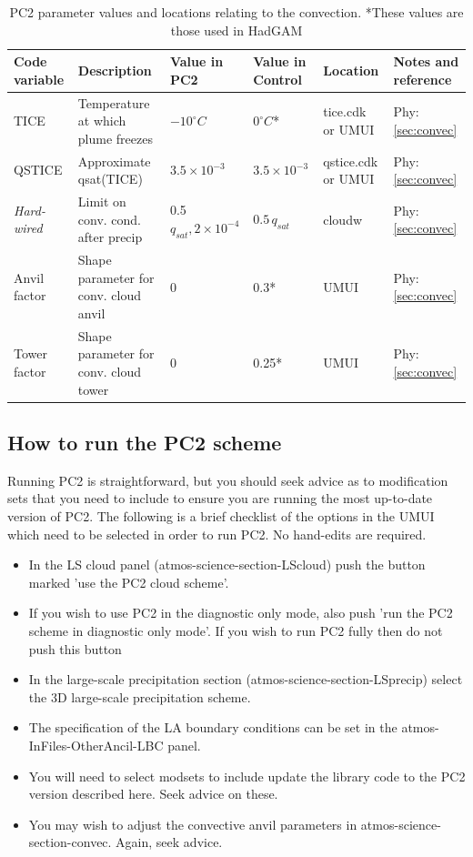 \documentclass{UMDP_article}
\begin{document}
\begin{table}[ht]
\begin{center}
\tiny
\begin{tabular}{llllll}
\hline
Code variable   & Description                                     & Value in PC2  & Value in Control         & Location   & Notes and reference    \\ \hline
TICE            & Temperature at which plume freezes & $-10 ^{\circ} C$     & $0 ^{\circ} C$*                  & tice.cdk or UMUI   &  Phy: \ref{sec:convec} \\
QSTICE          & Approximate qsat(TICE) & $3.5 \times 10^{-3}$ & $3.5 \times 10^{-3}$ & qstice.cdk or UMUI &  Phy: \ref{sec:convec} \\
\textit{Hard-wired} & Limit on conv. cond. after precip & 0.5 $q_{sat}, 2 \times 10^{-4}$ & $0.5 \, q_{sat}$         & cloudw     &  Phy: \ref{sec:convec} \\
Anvil factor    & Shape parameter for conv. cloud anvil      & 0             & 0.3*                     & UMUI       &  Phy: \ref{sec:convec} \\
Tower factor    & Shape parameter for conv. cloud tower      & 0             & 0.25*                    & UMUI       &  Phy: \ref{sec:convec} \\
\hline
\end{tabular}
\end{center}
\caption{PC2 parameter values and locations relating to the convection. *These values are those used in HadGAM}
\label{tab:pc2_conv_names}
\end{table}

\subsection{How to run the PC2 scheme}
Running PC2 is straightforward, but you should seek advice as to
modification sets that you need to include to ensure you are
running the most up-to-date version of PC2.
The following is a brief checklist of the options in the UMUI which need
to be selected in order to run PC2. No hand-edits are required.
\begin{itemize}
\item{In the LS cloud panel (atmos-science-section-LScloud) push the button marked 'use the PC2 cloud scheme'.}
\item{If you wish to use PC2 in the diagnostic only mode, also push 'run the PC2 scheme in diagnostic only mode'. If you wish to run PC2 fully then do not push this button}
\item{In the large-scale precipitation section (atmos-science-section-LSprecip) select the 3D large-scale precipitation scheme.}
\item{The specification of the LA boundary conditions can be set in the atmos-InFiles-OtherAncil-LBC panel.}
\item{You will need to select modsets to include update the library code to the PC2 version described here. Seek advice on these.}
\item{You may wish to adjust the convective anvil parameters in atmos-science-section-convec. Again, seek advice.}
\end{itemize}
\end{document}
